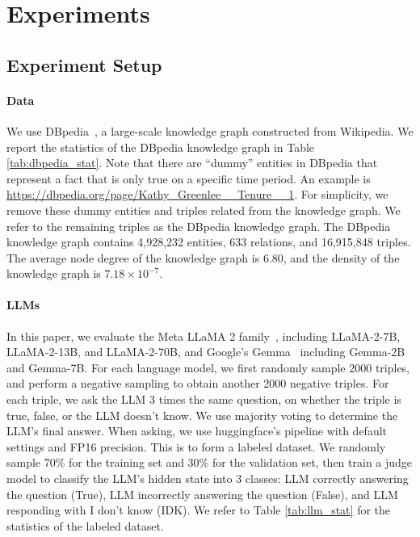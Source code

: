 \section{Experiments}

\subsection{Experiment Setup}





\paragraph{Data}
We use DBpedia~\cite{auer2007dbpedia}, a large-scale knowledge graph constructed from Wikipedia. 
We report the statistics of the DBpedia knowledge graph in Table \ref{tab:dbpedia_stat}.  Note that there are ``dummy'' entities in DBpedia that represent a fact that is only true on a specific time period. An example is \url{https://dbpedia.org/page/Kathy\_Greenlee\_\_Tenure\_\_1}. For simplicity, we remove these dummy entities and triples related from the knowledge graph. We refer to the remaining triples as the DBpedia knowledge graph. The DBpedia knowledge graph contains 4,928,232 entities, 633 relations, and 16,915,848 triples. The average node degree of the knowledge graph is 6.80, and the density of the knowledge graph is $7.18\times 10^{-7}$. 


 
   

\paragraph{LLMs}
In this paper, we evaluate the Meta LLaMA 2 family~\cite{touvron2023llama}, including LLaMA-2-7B, LLaMA-2-13B, and LLaMA-2-70B, and Google's Gemma~\cite{gemmateam2024gemma} including Gemma-2B and Gemma-7B. 
For each language model, we first randomly sample 2000 triples, and perform a negative sampling to obtain another 2000 negative triples. For each triple, we ask the LLM 3 times the same question, on whether the triple is true, false, or the LLM doesn't know. We use majority voting to determine the LLM's final answer. When asking, we use huggingface's pipeline with default settings and FP16 precision. 
 This is to form a labeled dataset. We randomly sample 70\% for the training set and 30\% for the validation set, then train a judge model to classify the LLM's hidden state into 3 classes: LLM correctly answering the question (True), LLM incorrectly answering the question (False), and LLM responding with I don't know (IDK). We refer to Table \ref{tab:llm_stat} for the statistics of the labeled dataset.


